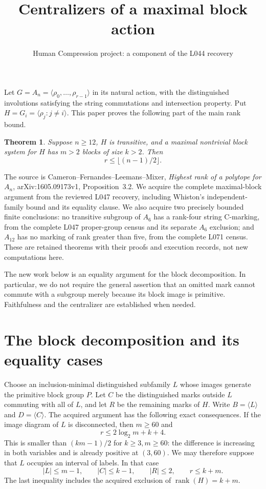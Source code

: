 \documentclass[11pt,a4paper]{article}
\title{Centralizers of a maximal block action}
\author{Human Compression project: a component of the L044 recovery}
\date{}
\newtheorem{theorem}{Theorem}
\newcommand{\gen}[1]{\langle#1\rangle}
\begin{document}
\maketitle
Let $G=A_n=\gen{\rho_0,\ldots,\rho_{r-1}}$ in its natural action,
with the distinguished involutions satisfying the string commutations and
intersection property. Put $H=G_i=\gen{\rho_j:j\ne i}$.
This paper proves the following part of the main rank bound.

\begin{theorem}\label{main}
Suppose $n\ge12$, $H$ is transitive, and a maximal nontrivial block
system for $H$ has $m>2$ blocks of size $k>2$. Then
\[
                         r\le\lfloor(n-1)/2\rfloor.
\]
\end{theorem}

The source is Cameron--Fernandes--Leemans--Mixer, \emph{Highest rank
of a polytope for $A_n$}, arXiv:1605.09173v1, Proposition~3.2.
We acquire the complete maximal-block argument from the reviewed L047
recovery, including Whiston's independent-family bound and its equality
clause. We also acquire two precisely bounded finite conclusions: no
transitive subgroup of $A_6$ has a rank-four string C-marking, from the
complete L047 proper-group census and its separate $A_6$ exclusion;
and $A_{12}$ has no marking of rank greater than five, from the complete
L071 census. These are retained theorems with their proofs and execution
records, not new computations here.

The new work below is an equality argument for the block decomposition.
In particular, we do not require the general assertion that an omitted
mark cannot commute with a subgroup merely because its block image is
primitive. Faithfulness and the centralizer are established when needed.

\section{The block decomposition and its equality cases}
Choose an inclusion-minimal distinguished subfamily $L$ whose images
generate the primitive block group $P$. Let $C$ be the distinguished
marks outside $L$ commuting with all of $L$, and let $R$ be the remaining
marks of $H$. Write $B=\gen L$ and $D=\gen C$.
The acquired argument has the following exact consequences.
If the image diagram of $L$ is disconnected, then $m\ge60$ and
\[
                    r\le2\log_2m+k+4.
\]
This is smaller than $(km-1)/2$ for $k\ge3,m\ge60$: the difference
is increasing in both variables and is already positive at $(3,60)$.
We may therefore suppose that $L$ occupies an interval of labels.
In that case
\[
 |L|\le m-1,\qquad |C|\le k-1,\qquad |R|\le2,
 \qquad r\le k+m.                                      \tag{1}
\]
The last inequality includes the acquired exclusion of
$\operatorname{rank}(H)=k+m$.
\end{document}
